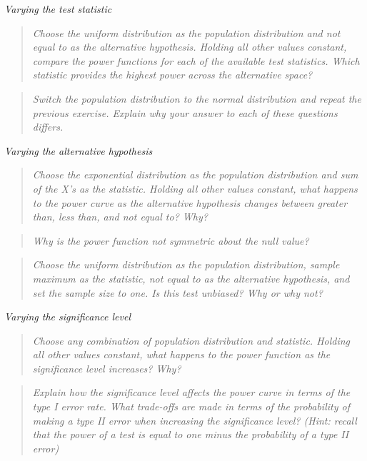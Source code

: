 \documentclass{TISE}
\begin{document}
\textit{Varying the test statistic}

\begin{quote}
	\textit{Choose the uniform distribution as the population distribution and not equal to as the alternative hypothesis. Holding all other values constant, compare the power functions for each of the available test statistics. Which statistic provides the highest power across the alternative space?}
\end{quote}

\begin{quote}
	\textit{Switch the population distribution to the normal distribution and repeat the previous exercise. Explain why your answer to each of these questions differs.}
\end{quote}

\textit{Varying the alternative hypothesis}

\begin{quote}
	\textit{Choose the exponential distribution as the population distribution and sum of the X's as the statistic. Holding all other values constant, what happens to the power curve as the alternative hypothesis changes between greater than, less than, and not equal to? Why?}
\end{quote}

\begin{quote}
	\textit{Why is the power function not symmetric about the null value?}
\end{quote}

\begin{quote}
	\textit{Choose the uniform distribution as the population distribution, sample maximum as the statistic, not equal to as the alternative hypothesis, and set the sample size to one. Is this test unbiased? Why or why not?}
\end{quote}

\textit{Varying the significance level}

\begin{quote}
	\textit{Choose any combination of population distribution and statistic. Holding all other values constant, what happens to the power function as the significance level increases? Why?}
\end{quote}

\begin{quote}
	\textit{Explain how the significance level affects the power curve in terms of the type I error rate. What trade-offs are made in terms of the probability of making a type II error when increasing the significance level? (Hint: recall that the power of a test is equal to one minus the probability of a type II error)}
\end{quote}
\end{document}

